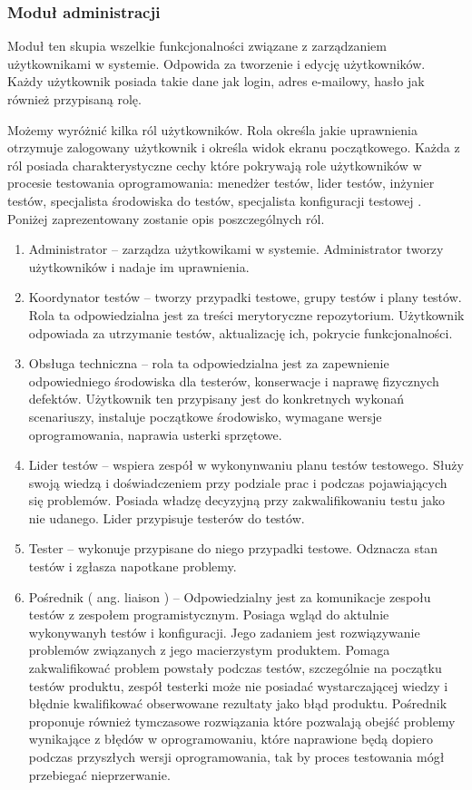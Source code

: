 \subsubsection{Moduł administracji}

Moduł ten skupia wszelkie funkcjonalności związane z zarządzaniem użytkownikami w systemie. Odpowida za tworzenie i edycję użytkowników. Każdy użytkownik posiada takie dane jak login, adres e-mailowy, hasło jak również przypisaną rolę.

Możemy wyróżnić kilka ról użytkowników. Rola określa jakie uprawnienia otrzymuje zalogowany użytkownik i określa widok ekranu początkowego. Każda z ról posiada charakterystyczne cechy które pokrywają role użytkowników w procesie testowania oprogramowania: menedżer testów, lider testów, inżynier testów, specjalista środowiska do testów, specjalista konfiguracji testowej \cite{peopleWare}. Poniżej zaprezentowany zostanie opis poszczególnych ról.
\begin{enumerate}
  \item Administrator --  zarządza użytkowikami w systemie. Administrator tworzy użytkowników i nadaje im uprawnienia.
  \item Koordynator testów -- tworzy przypadki testowe, grupy testów i plany testów. Rola ta odpowiedzialna jest za treści merytoryczne repozytorium. Użytkownik odpowiada za utrzymanie testów, aktualizację ich, pokrycie funkcjonalności. 
  \item Obsługa techniczna -- rola ta odpowiedzialna jest za zapewnienie odpowiedniego środowiska dla testerów, konserwacje i naprawę fizycznych defektów. Użytkownik ten przypisany jest do konkretnych wykonań scenariuszy, instaluje początkowe środowisko, wymagane wersje oprogramowania, naprawia usterki sprzętowe.
  \item Lider testów -- wspiera zespół w wykonynwaniu planu testów testowego. Służy swoją wiedzą i doświadczeniem przy podziale prac i podczas pojawiających się problemów. Posiada władzę decyzyjną przy zakwalifikowaniu testu jako nie udanego. Lider przypisuje testerów do testów.
  \item Tester --  wykonuje przypisane do niego przypadki testowe. Odznacza stan testów i zgłasza napotkane problemy.
  \item Pośrednik ( ang. liaison ) --  Odpowiedzialny jest za komunikacje zespołu testów z zespołem programistycznym. Posiaga wgląd do aktulnie wykonywanyh testów i konfiguracji. Jego zadaniem jest rozwiązywanie problemów związanych z jego macierzystym produktem. Pomaga zakwalifikować problem powstały podczas testów, szczególnie na początku testów produktu, zespół testerki może nie posiadać wystarczającej wiedzy i błędnie kwalifikować obserwowane rezultaty jako błąd produktu. Pośrednik proponuje również tymczasowe rozwiązania które pozwalają obejść problemy wynikające z błędów w oprogramowaniu, które naprawione będą dopiero podczas przyszłych wersji oprogramowania, tak by proces testowania mógł przebiegać nieprzerwanie.
\end{enumerate}
  
